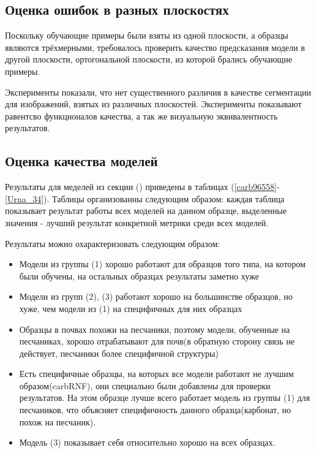 \documentclass[14pt, a4paper, oneside, bold]{extarticle}
\begin{document}
\subsection{Оценка ошибок в разных плоскостях}

Поскольку обучающие примеры были взяты из одной плоскости, а образцы являются трёхмерными, требовалось проверить качество предсказания модели в другой плоскости, ортогональной плоскости, из которой брались обучающие примеры. 

Эксперименты показали, что нет существенного различия в качестве сегментации для изображений, взятых из различных плоскостей. Эксперименты показывают равентсво функционалов качества, а так же визуальную эквивалентность результатов. 

\subsection{Оценка качества моделей}

Результаты для меделей из секции () приведены в таблицах (\ref{carb96558}-\ref{Urna_34}). Таблицы организованны следующим образом: каждая таблица показывает результат работы всех моделей на данном образце, выделенные значения - лучший результат конкретной метрики среди всех моделей. 

Результаты можно охарактеризовать следующим образом:
\begin{itemize}
	\item Модели из группы (1) хорошо работают для образцов того типа, на котором были обучены, на остальных образцах результаты заметно хуже
	
	\item Модели из групп (2), (3) работают хорошо на большинстве образцов, но хуже, чем модели из (1) на специфичных для них образцах
	
	\item Образцы в почвах похожи на песчаники, поэтому модели, обученные на песчаниках, хорошо отрабатывают для почв(в обратную сторону связь не действует, песчаники более специфичной структуры)
	
	\item Есть специфичные образцы, на которых все модели работают не лучшим образом(carbRNF), они специально были добавлены для проверки результатов. На этом образце лучше всего работает модель из группы (1) для песчаников, что объясняет специфичность данного образца(карбонат, но похож на песчаник).
	
	\item Модель (3) показывает себя относительно хорошо на всех образцах.
	
\end{itemize}
\end{document}
